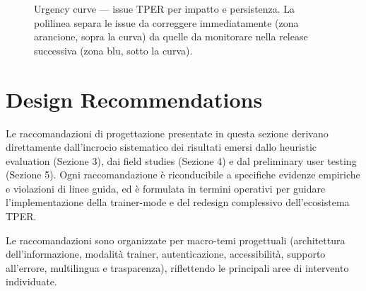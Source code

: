 \documentclass[11pt,a4paper]{article}
\begin{document}
\begin{figure}[H]
\caption{Urgency curve --- issue TPER per impatto e persistenza.
  La polilinea separa le issue da correggere immediatamente (zona arancione,
  sopra la curva) da quelle da monitorare nella release successiva
  (zona blu, sotto la curva).}
\label{fig:urgency-curve}
\end{figure}

\newpage


\section{Design Recommendations}

\label{sec:design-recommendations}

Le raccomandazioni di progettazione presentate in questa sezione derivano
direttamente dall'incrocio sistematico dei risultati emersi dallo heuristic
evaluation (Sezione 3), dai field studies (Sezione 4) e dal preliminary user
testing (Sezione 5). Ogni raccomandazione è riconducibile a specifiche evidenze
empiriche e violazioni di linee guida, ed è formulata in termini operativi per
guidare l'implementazione della trainer-mode e del redesign complessivo
dell'ecosistema TPER.

Le raccomandazioni sono organizzate per macro-temi progettuali (architettura
dell'informazione, modalità trainer, autenticazione, accessibilità, supporto
all'errore, multilingua e trasparenza), riflettendo le principali aree di
intervento individuate.
\end{document}
